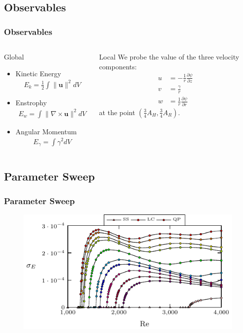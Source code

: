 \documentclass[compress]{beamer}
\begin{document}
\subsection{Observables}
\begin{frame}\frametitle{Observables}
\begin{columns}
\begin{block}{Global}
\begin{itemize}
\item Kinetic Energy
\begin{align*}
E_k = \frac{1}{2}\int \|\textbf{u}\|^2dV
\end{align*}
\item Enstrophy
\begin{align*}
E_w = \int \|\nabla\times\textbf{u}\|^2dV
\end{align*}
\item Angular Momentum
\begin{align*}
E_{\gamma} = \int \gamma^2dV
\end{align*}
\end{itemize}
\end{block}
\begin{block}{Local}
We probe the value of the three velocity components:
\begin{align*}
u &= -\frac{1}{r}\frac{\partial\psi}{\partial z}\\
v &= \frac{\gamma}{r}\\
w &= \frac{1}{r}\frac{\partial\psi}{\partial r}
\end{align*}
 at the point $\left(\frac{3}{4}A_H,\frac{3}{4}A_R\right)$.
\end{block}
\end{columns}
\end{frame}

\subsection{Parameter Sweep}

\begin{frame}\frametitle{Parameter Sweep}
\begin{figure}
\centering
\includegraphics[scale=1.2]{parGraphalpha0e0.pdf}
\end{figure}
\end{frame}
\end{document}
